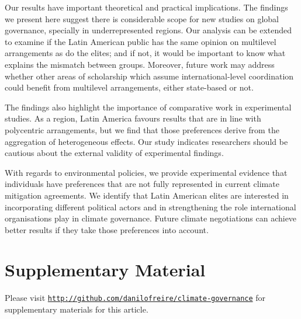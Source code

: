 \documentclass[a4paper,12pt]{article}
\begin{document}
Our results have important theoretical and practical implications. The findings we present here suggest there is considerable scope for new studies on global governance, specially in underrepresented regions. Our analysis can be extended to examine if the Latin American public has the same opinion on multilevel arrangements as do the elites; and if not, it would be important to know what explains the mismatch between groups. Moreover, future work may address whether other areas of scholarship which assume international-level coordination could benefit from multilevel arrangements, either state-based or not.   

The findings also highlight the importance of comparative work in experimental studies. As a region, Latin America favours results that are in line with polycentric arrangements, but we find that those preferences derive from the aggregation of heterogeneous effects. Our study indicates researchers should be cautious about the external validity of experimental findings. %

With regards to environmental policies, we provide experimental evidence that individuals have preferences that are not fully represented in current climate mitigation agreements. We identify that Latin American elites are interested in incorporating different political actors and in strengthening the role international organisations play in climate governance. Future climate negotiations can achieve better results if they take those preferences into account. 

\section*{Supplementary Material}
\label{sec:supplementary}

Please visit \href{http://github.com/danilofreire/climate-governance}{\texttt{http://github.com/danilofreire/climate-governance}} for supplementary materials for this article.

\newpage



\end{document}
